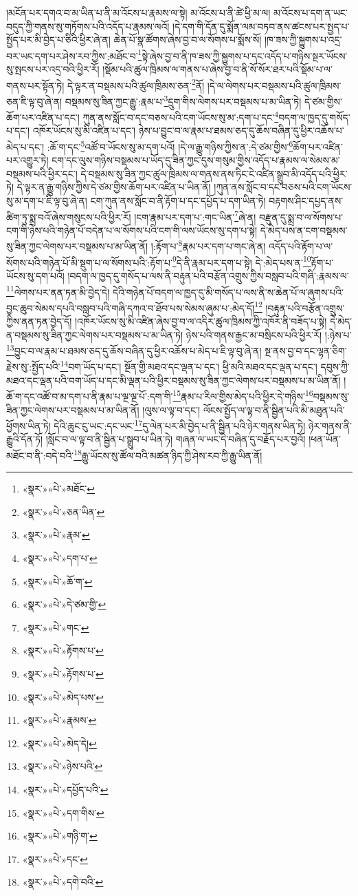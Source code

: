།མངོན་པར་དགའ་བ་མ་ཡིན་པ་ནི་མ་འོངས་པ་རྣམས་ལ་སྟེ། མ་འོངས་པ་ནི་ཚེ་ཕྱི་མ་ལ། མ་འོངས་པ་དག་ན་ཡང་བདུད་ཀྱི་གནས་སུ་གཏོགས་པའི་འདོད་པ་རྣམས་ལའོ། །དེ་དག་གི་དོན་དུ་སྨོན་ལམ་བཏབ་ནས་ཚངས་པར་སྤྱད་པ་སྤྱོད་པར་མི་བྱེད་པ་ཅིའི་ཕྱིར་ཞེ་ན། ཆེན་པོ་སྣ་ཚོགས་ཞེས་བྱ་བ་ལ་སོགས་པ་སྨོས་སོ། །ཁ་ཟས་ཀྱི་སྐྱུགས་པ་འདྲ་བར་ཡང་དག་པར་ཤེས་རབ་ཀྱིས་:མཐོང་བ་\footnote{«སྣར་»«པེ་»མཐོང་}སྟེ་ཞེས་བྱ་བ་ནི་ཁ་ཟས་ཀྱི་སྐྱུགས་པ་དང་འདོད་པ་གཉིས་སྔར་ཡོངས་སུ་སྤངས་པར་འདྲ་བའི་ཕྱིར་རོ། །སྡོམ་པའི་ཚུལ་ཁྲིམས་ལ་གནས་པ་ཞེས་བྱ་བ་ནི་སོ་སོར་ཐར་པའི་སྡོམ་པ་ལ་གནས་པར་སྟོན་ཏེ། དེ་ལྟར་ན་བསྡམས་པའི་ཚུལ་ཁྲིམས་ཅན་\footnote{«སྣར་»«པེ་»ཅན་ཡིན་}ནོ། །དེ་ལ་ལེགས་པར་བསྡམས་པའི་ཚུལ་ཁྲིམས་ཅན་ཇི་ལྟ་བུ་ཞེ་ན། བསྡམས་སུ་ཟིན་ཀྱང་རྒྱུ་:རྣམ་པ་\footnote{«སྣར་»«པེ་»རྣམ་}དྲུག་གིས་ལེགས་པར་བསྡམས་པ་མ་ཡིན་ཏེ། དེ་ཙམ་གྱིས་ཆོག་པར་འཛིན་པ་དང་། ཀུན་ནས་སློང་བ་དང་བཅས་པའི་ངག་ཡོངས་སུ་མ་:དག་པ་དང་\footnote{«སྣར་»«པེ་»དག་པ་}བདག་ལ་ཁྱད་དུ་གསོད་པ་དང་། འཁོར་ཡོངས་སུ་མི་འཛིན་པ་དང་། ཉེས་པ་བྱུང་བ་ལ་རྣམ་པ་ཐམས་ཅད་དུ་ཆོས་བཞིན་དུ་ཕྱིར་འཆོས་པ་མེད་པ་དང་། :ཆོ་ག་དང་\footnote{«སྣར་»«པེ་»ཆོ་ག་}འཚོ་བ་ཡོངས་སུ་མ་དག་པའོ། །དེ་ལ་རྒྱུ་གཉིས་ཀྱིས་ན་:དེ་ཙམ་གྱིས་\footnote{«སྣར་»«པེ་»དེ་ཙམ་གྱི་}ཆོག་པར་འཛིན་པར་འགྱུར་ཏེ། ངག་དང་ལུས་གཉིས་བསྡམས་པ་ཡོད་དུ་ཟིན་ཀྱང་དུས་གསུམ་གྱིས་འདོད་པ་རྣམས་ལ་སེམས་མ་བསྡམས་པའི་ཕྱིར་དང་། དེ་བསྡམས་སུ་ཟིན་ཀྱང་ཚུལ་ཁྲིམས་ལ་གནས་ནས་ཏིང་ངེ་འཛིན་སྒྲུབ་མི་འདོད་པའི་ཕྱིར་ཏེ། དེ་ལྟར་ན་རྒྱུ་གཉིས་ཀྱིས་དེ་ཙམ་གྱིས་ཆོག་པར་འཛིན་པ་ཡིན་ནོ། །ཀུན་ནས་སློང་བ་དང་བཅས་པའི་ངག་ཡོངས་སུ་མ་དག་པ་ཇི་ལྟ་བུ་ཞེ་ན། ངག་ཀུན་ནས་སློང་བ་ནི་རྟོག་པ་དང་དཔྱོད་པ་དག་ཡིན་ཏེ། བརྟགས་ཤིང་དཔྱད་ནས་ཚིག་ཏུ་སྨྲ་བའོ་ཞེས་གསུངས་པའི་ཕྱིར་རོ། །ངག་རྣམ་པར་དག་པ་:གང་ཡིན་\footnote{«སྣར་»«པེ་»གང་}ཞེ་ན། བརྫུན་དུ་སྨྲ་བ་ལ་སོགས་པ་ངག་གི་ཉེས་པའི་གཉེན་པོ་བདེན་པ་ལ་སོགས་པའི་ངག་གི་ལས་ཡོངས་སུ་དག་པ་སྟེ། དེ་མེད་པས་ན་ངག་བསྡམས་སུ་ཟིན་ཀྱང་ལེགས་པར་བསྡམས་པ་མ་ཡིན་ནོ། །:རྟོག་པ་\footnote{«སྣར་»«པེ་»རྟོགས་པ་}རྣམ་པར་དག་པ་གང་ཞེ་ན། འདོད་པའི་རྟོག་པ་ལ་སོགས་པའི་གཉེན་པོ་མི་སྡུག་པ་ལ་སོགས་པའི་:རྟོག་པ་\footnote{«སྣར་»«པེ་»རྟོགས་པ་}དེ་ནི་རྣམ་པར་དག་པ་སྟེ། དེ་:མེད་པས་ན་\footnote{«སྣར་»«པེ་»མེད་པས་}རྟོག་པ་ཡོངས་སུ་དག་པའོ། །བདག་ལ་ཁྱད་དུ་གསོད་པ་ལས་ནི་བརྟུན་པའི་བརྩོན་འགྲུས་ཀྱིས་བསླབ་པའི་གཞི་:རྣམས་ལ་\footnote{«སྣར་»«པེ་»རྣམས་}ལེགས་པར་ནན་ཏན་མི་བྱེད་དེ། དེའི་གཉེན་པོ་བདག་ལ་ཁྱད་དུ་མི་གསོད་པ་ལས་ནི་ས་ཆེན་པོ་ལ་ཞུགས་པའི་བྱང་ཆུབ་སེམས་དཔའི་བསླབ་པའི་གཞི་དཀའ་བ་ཐོབ་པས་སེམས་ཞུམ་པ་:མེད་དོ།\footnote{«སྣར་»«པེ་»མེད་དེ།} །བརྟུན་པའི་བརྩོན་འགྲུས་ཀྱིས་ནན་ཏན་བྱེད་དོ། །འཁོར་ཡོངས་སུ་མི་འཛིན་ཞེས་བྱ་བ་ལ་འདིར་ཚུལ་ཁྲིམས་ཀྱི་འཁོར་ནི་བཟོད་པ་སྟེ། དེ་མེད་ན་བསྡམས་སུ་ཟིན་ཀྱང་ལེགས་པར་བསྡམས་པ་མ་ཡིན་ཏེ། ཉེས་པའི་གནས་རྒྱང་མ་བསྲིངས་པའི་ཕྱིར་རོ། །:ཉེས་པ་\footnote{«སྣར་»«པེ་»ཉེས་པའི་}བྱུང་བ་ལ་རྣམ་པ་ཐམས་ཅད་དུ་ཆོས་བཞིན་དུ་ཕྱིར་འཆོས་པ་མེད་པ་ཇི་ལྟ་བུ་ཞེ་ན། སྔ་ནས་བྱ་བ་དང་ལྷན་ཅིག་རྗེས་སུ་:སྤྱོད་པའི་\footnote{«སྣར་»«པེ་»དཔྱོད་པའི་}བག་ཡོད་པ་དང་། སྔོན་གྱི་མཐའ་དང་ལྡན་པ་དང་། ཕྱི་མའི་མཐའ་དང་ལྡན་པ་དང་། དབུས་ཀྱི་མཐའ་དང་ལྡན་པའི་བག་ཡོད་པ་དང་མི་ལྡན་པའི་ཕྱིར་བསྡམས་སུ་ཟིན་ཀྱང་ལེགས་པར་བསྡམས་པ་མ་ཡིན་ནོ། །ཆོ་ག་དང་འཚོ་བ་མ་དག་པ་ནི་རྣམ་པ་ལྔ་ལྔ་པོ་:དག་གི་\footnote{«སྣར་»«པེ་»དག་གིས་}རྣམ་པ་རིལ་གྱིས་མེད་པའི་ཕྱིར་དེ་གཉིས་\footnote{«སྣར་»«པེ་»གཉི་ག་}བསྡམས་སུ་ཟིན་ཀྱང་ལེགས་པར་བསྡམས་པ་མ་ཡིན་ནོ། །ལུས་ལ་ལྟ་བ་དང་། ལོངས་སྤྱོད་ལ་ལྟ་བ་ནི་སྦྱིན་པའི་མི་མཐུན་པའི་ཕྱོགས་ཡིན་ཏེ། དེའི་ཆུང་ངུ་ཡང་:དང་ཡང་\footnote{«སྣར་»«པེ་»དང་}དུ་ལེན་པར་མི་བྱེད་པ་ནི་སྦྱིན་པའི་ཉེར་གནས་ཡིན་ཏེ། ཉེར་གནས་ནི་རྒྱུའི་དོན་ཏོ། །སློང་བ་ལ་ལྟ་བ་ནི་སྦྱིན་པ་སྒྲུབ་པ་ཡིན་ཏེ། གཞན་ལ་ཡང་དེ་བཞིན་དུ་བརྗོད་པར་བྱའོ། །ཕན་ཡོན་མཐོང་བ་ནི་:བདེ་བའི་\footnote{«སྣར་»«པེ་»དགེ་བའི་}རྒྱུ་ཡོངས་སུ་ཚོལ་བའི་མཚན་ཉིད་ཀྱི་ཤེས་རབ་ཀྱི་རྒྱུ་ཡིན་ནོ། 